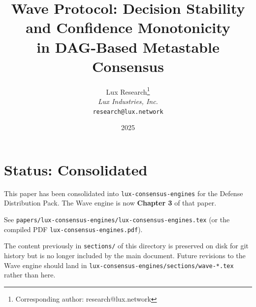 \documentclass[11pt,a4paper]{article}
\title{\textbf{Wave Protocol: Decision Stability and Confidence Monotonicity\\in DAG-Based Metastable Consensus}}
\author{
Lux Research\thanks{Corresponding author: research@lux.network}\\
\textit{Lux Industries, Inc.}\\
\texttt{research@lux.network}
}
\date{2025}
\begin{document}
\luxcoverpage

\section*{Status: Consolidated}

This paper has been consolidated into \texttt{lux-consensus-engines} for the
Defense Distribution Pack. The Wave engine is now \textbf{Chapter 3} of that paper.

See \texttt{papers/lux-consensus-engines/lux-consensus-engines.tex} (or the
compiled PDF \texttt{lux-consensus-engines.pdf}).

The content previously in \texttt{sections/} of this directory is preserved on
disk for git history but is no longer included by the main document. Future
revisions to the Wave engine should land in
\texttt{lux-consensus-engines/sections/wave-*.tex} rather than here.
\end{document}
